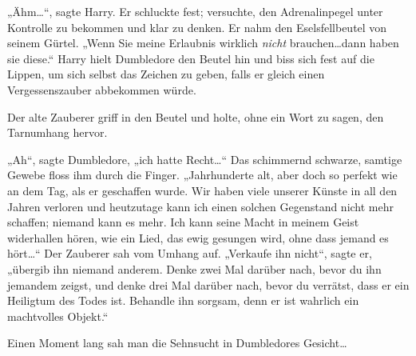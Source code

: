 „Ähm…“, sagte Harry. Er schluckte fest; versuchte, den Adrenalinpegel unter Kontrolle zu bekommen und klar zu denken. Er nahm den Eselsfellbeutel von seinem Gürtel. „Wenn Sie meine Erlaubnis wirklich \emph{nicht} brauchen…dann haben sie diese.“ Harry hielt Dumbledore den Beutel hin und biss sich fest auf die Lippen, um sich selbst das Zeichen zu geben, falls er gleich einen Vergessenszauber abbekommen würde.

Der alte Zauberer griff in den Beutel und holte, ohne ein Wort zu sagen, den Tarnumhang hervor.

„Ah“, sagte Dumbledore, „ich hatte Recht…“ Das schimmernd schwarze, samtige Gewebe floss ihm durch die Finger. „Jahrhunderte alt, aber doch so perfekt wie an dem Tag, als er geschaffen wurde. Wir haben viele unserer Künste in all den Jahren verloren und heutzutage kann ich einen solchen Gegenstand nicht mehr schaffen; niemand kann es mehr. Ich kann seine Macht in meinem Geist widerhallen hören, wie ein Lied, das ewig gesungen wird, ohne dass jemand es hört…“ Der Zauberer sah vom Umhang auf. „Verkaufe ihn nicht“, sagte er, „übergib ihn niemand anderem. Denke zwei Mal darüber nach, bevor du ihn jemandem zeigst, und denke drei Mal darüber nach, bevor du verrätst, dass er ein Heiligtum des Todes ist. Behandle ihn sorgsam, denn er ist wahrlich ein machtvolles Objekt.“

Einen Moment lang sah man die Sehnsucht in Dumbledores Gesicht…

